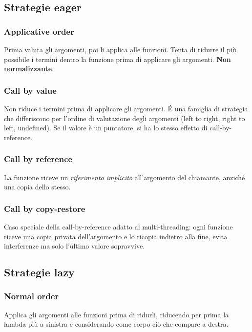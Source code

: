 \subsection{Strategie eager}

\subsubsection{Applicative order}
Prima valuta gli argomenti, poi li applica alle funzioni. Tenta di ridurre il più possibile i termini dentro la funzione prima di applicare gli argomenti.
\textbf{Non normalizzante}.

\subsubsection{Call by value}
Non riduce i termini prima di applicare gli argomenti. É una famiglia di strategia che differiscono per l'ordine di valutazione degli argomenti (left to right, right to left, undefined).
Se il valore è un puntatore, si ha lo stesso effetto di call-by-reference.

\subsubsection{Call by reference}
La funzione riceve un \textit{riferimento implicito} all'argomento del chiamante, anziché una copia dello stesso.

\subsubsection{Call by copy-restore}
Caso speciale della call-by-reference adatto al multi-threading: ogni funzione riceve una copia privata dell'argomento e lo ricopia indietro alla fine, evita interferenze ma solo l'ultimo valore sopravvive.

\subsection{Strategie lazy}

\subsubsection{Normal order}
Applica gli argomenti alle funzioni prima di ridurli, riducendo per prima la lambda più a sinistra e considerando come corpo ciò che compare a destra.
































